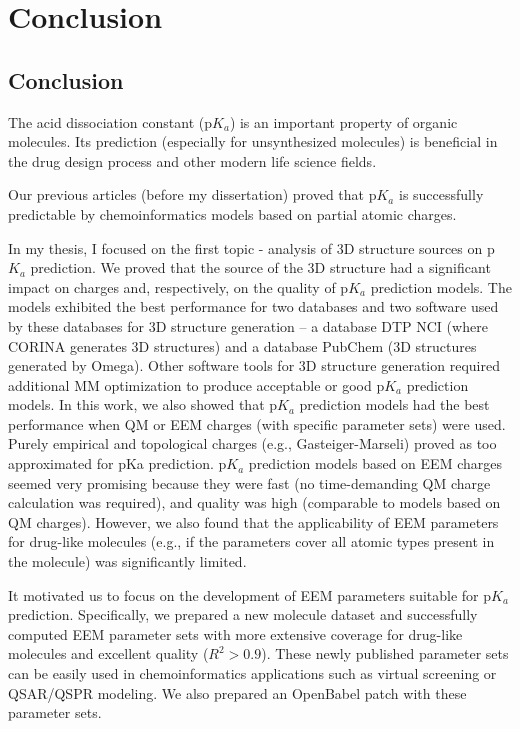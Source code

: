 \part{Conclusion}

\chapter{Conclusion}

The acid dissociation constant (p$K_a$) is an important property of organic
molecules. Its prediction (especially for unsynthesized molecules) is beneficial
in the drug design process and other modern life science fields.

Our previous articles \cite{Svobodova2011, Svobodova2013} (before my
dissertation) proved that p$K_a$ is successfully predictable by
chemoinformatics models based on partial atomic charges.

In my thesis, I focused on the first topic - analysis of 3D structure sources
on p$K_a$ prediction. We proved that the source of the 3D structure had
a significant impact on charges and, respectively, on the quality of p$K_a$
prediction models. The models exhibited the best performance for two databases
and two software used by these databases for 3D structure generation -- 
a database DTP NCI (where CORINA generates 3D structures) and a database
PubChem (3D structures generated by Omega). Other software tools for 3D
structure generation required additional MM optimization to produce acceptable
or good p$K_a$ prediction models. In this work, we also showed that p$K_a$
prediction models had the best performance when QM or EEM charges (with specific
parameter sets) were used. Purely empirical and topological charges (e.g.,
Gasteiger-Marseli) proved as too approximated for pKa prediction. p$K_a$
prediction models based on EEM charges seemed very promising because they were
fast (no time-demanding QM charge calculation was required), and quality was
high (comparable to models based on QM charges). However, we also found that
the applicability of EEM parameters for drug-like molecules (e.g., if the
parameters cover all atomic types present in the molecule) was significantly
limited. 

It motivated us to focus on the development of EEM parameters suitable 
for p$K_a$ prediction. Specifically, we prepared a new molecule dataset and
successfully computed EEM parameter sets with more extensive coverage
for drug-like molecules and excellent quality ($R^2 > 0.9$). These newly published
parameter sets can be easily used in chemoinformatics applications
such as virtual screening or QSAR/QSPR modeling. We also prepared an OpenBabel
patch with these parameter sets.


